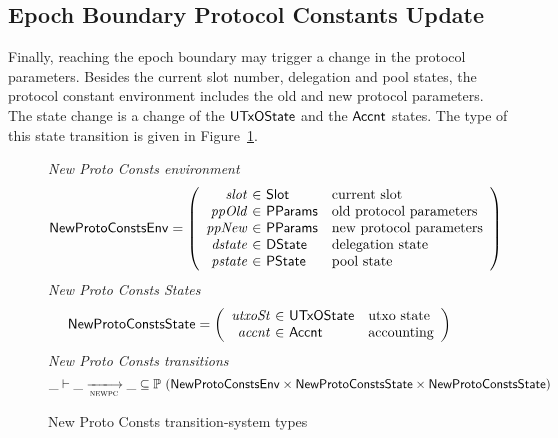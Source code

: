 \subsection{Epoch Boundary Protocol Constants Update}
\label{sec:prot-const-epoch}

Finally, reaching the epoch boundary may trigger a change in the protocol
parameters. Besides the current slot number, delegation and pool states, the
protocol constant environment includes the old and new protocol parameters.
The state change is a change of the $\mathsf{UTxOState}$ and the $\mathsf{Accnt}$ states.
The type of this state transition is given in Figure~\ref{fig:ts-types:new-proto-consts}.

\begin{figure}[htb]
  \emph{New Proto Consts environment}
  \begin{equation*}
    \NewProtoConstsEnv =
    \left(
      \begin{array}{r@{~\in~}ll}
        \var{slot} & \Slot & \text{current slot}\\
        \var{ppOld} & \PParams & \text{old protocol parameters}\\
        \var{ppNew} & \PParams & \text{new protocol parameters}\\
        \var{dstate} & \DState & \text{delegation state}\\
        \var{pstate} & \PState & \text{pool state}\\
      \end{array}
    \right)
  \end{equation*}
  \emph{New Proto Consts States}
  \begin{equation*}
    \NewProtoConstsState =
    \left(
      \begin{array}{r@{~\in~}ll}
        \var{utxoSt} & \UTxOState & \text{utxo state}\\
        \var{accnt} & \Accnt & \text{accounting}\\
      \end{array}
    \right)
  \end{equation*}
  \emph{New Proto Consts transitions}
  \begin{equation*}
    \_ \vdash
    \var{\_} \trans{newpc}{} \var{\_}
    \subseteq \powerset (\NewProtoConstsEnv \times
    \NewProtoConstsState \times \NewProtoConstsState)
  \end{equation*}
  \caption{New Proto Consts transition-system types}
  \label{fig:ts-types:new-proto-consts}
\end{figure}


